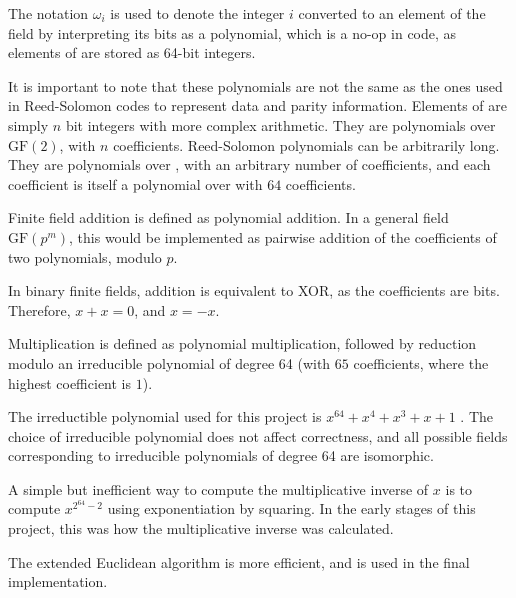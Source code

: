 The notation $\omega_i$ is used to denote the integer $i$ converted to an element of the field  by interpreting its bits as a polynomial, which is a no-op in code, as elements of  are stored as 64-bit integers.

It is important to note that these polynomials are not the same as the ones used in Reed-Solomon codes to represent data and parity information.
Elements of  are simply $n$ bit integers with more complex arithmetic. They are polynomials over $\text{GF}(2)$, with $n$ coefficients.
Reed-Solomon polynomials can be arbitrarily long. They are polynomials over , with an arbitrary number of coefficients, and each coefficient is itself a polynomial over  with $64$ coefficients.

Finite field addition is defined as polynomial addition.
In a general field $\text{GF}(p^m)$, this would be implemented as pairwise addition of the coefficients of two polynomials, modulo $p$.

In binary finite fields, addition is equivalent to XOR, as the coefficients are bits. Therefore, $x + x = 0$, and $x = -x$.

Multiplication is defined as polynomial multiplication, followed by reduction modulo an irreducible polynomial of degree 64 (with $65$ coefficients, where the highest coefficient is $1$).

The irreductible polynomial used for this project is $x^{64} + x^4 + x^3 + x + 1$ \cite{low-weight-polynomials}.
The choice of irreducible polynomial does not affect correctness, and all possible fields corresponding to irreducible polynomials of degree 64 are isomorphic.

A simple but inefficient way to compute the multiplicative inverse of $x$ is to compute $x^{2^{64} - 2}$ using exponentiation by squaring.
In the early stages of this project, this was how the multiplicative inverse was calculated.

The extended Euclidean algorithm is more efficient, and is used in the final implementation.
